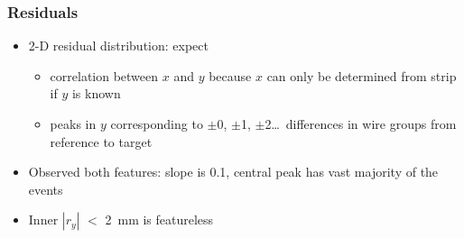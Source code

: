 \documentclass[compress]{beamer}
\begin{document}
\begin{frame}
\frametitle{Residuals}
\scriptsize
\begin{itemize}
\item 2-D residual distribution: expect
\begin{itemize}
\item \scriptsize correlation between $x$ and $y$ because $x$ can only be determined from strip if $y$ is known
\item \scriptsize peaks in $y$ corresponding to $\pm$0, $\pm$1,
  $\pm$2\ldots\ differences in wire groups from reference to target
\end{itemize}
\item Observed both features: slope is 0.1, central peak has vast majority of the events
\item Inner $|r_y|$ $<$ 2~mm is featureless
\end{itemize}


\end{frame}
\end{document}
